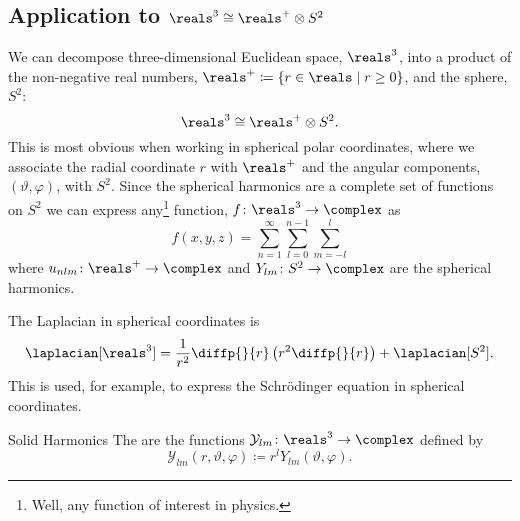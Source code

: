 \documentclass[fleqn]{NotesClass}
\newcommand*{\isomorphic}{\cong}
\newcommand*{\directproduct}{\otimes}
\begin{document}
    \subsection{Application to \texorpdfstring{\(\reals^3 \isomorphic \reals^+ \directproduct S^2\)}{R3 isomorphic R+ x S2}}
    We can decompose three-dimensional Euclidean space, \(\reals^3\), into a product of the non-negative real numbers, \(\reals^+ \coloneqq \{r \in \reals \mid r \ge 0\}\), and the sphere, \(S^2\):
    \begin{equation}
        \reals^3 \isomorphic \reals^+ \directproduct S^2.
    \end{equation}
    This is most obvious when working in spherical polar coordinates, where we associate the radial coordinate \(r\) with \(\reals^+\) and the angular components, \((\vartheta, \varphi)\), with \(S^2\).
    Since the spherical harmonics are a complete set of functions on \(S^2\) we can express any\footnote{Well, any function of interest in physics.} function, \(f \colon \reals^3 \to \complex\) as
    \begin{equation}
        f(x, y, z) = \sum_{n = 1}^{\infty} \sum_{l = 0}^{n - 1} \sum_{m = -l}^{l}
    \end{equation}
    where \(u_{nlm} \colon \reals^+ \to \complex\) and \(Y_{lm}\colon S^2 \to \complex\) are the spherical harmonics.
    
    The Laplacian in spherical coordinates is
    \begin{equation}
        \laplacian[\reals^3] = \frac{1}{r^2} \diffp{}{r}\left( r^2 \diffp{}{r} \right) + \laplacian[S^2].
    \end{equation}
    This is used, for example, to express the Schrödinger equation in spherical coordinates.
    
    \begin{dfn}{Solid Harmonics}{}
        The  are the functions \(\mathcal{Y}_{lm} \colon \reals^3 \to \complex\) defined by
        \begin{equation}
            \mathcal{Y}_{lm}(r, \vartheta, \varphi) \coloneqq r^{l} Y_{lm}(\vartheta, \varphi).
        \end{equation}
    \end{dfn}
    
\end{document}
